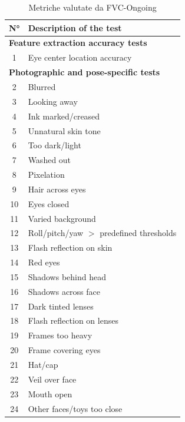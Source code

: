 \documentclass[12pt,a4paper,openright,twoside]{book}
\begin{document}
\begin{table}[h!]
\centering
\begin{tabular}{|c|p{10cm}|}
\hline
\textbf{N°} & \textbf{Description of the test} \\
\hline
\multicolumn{2}{|l|}{\textbf{Feature extraction accuracy tests}} \\
\hline
1 & Eye center location accuracy \\
\hline
\multicolumn{2}{|l|}{\textbf{Photographic and pose-specific tests}} \\
\hline
2 & Blurred \\
3 & Looking away \\
4 & Ink marked/creased \\
5 & Unnatural skin tone \\
6 & Too dark/light \\
7 & Washed out \\
8 & Pixelation \\
9 & Hair across eyes \\
10 & Eyes closed \\
11 & Varied background \\
12 & Roll/pitch/yaw $>$ predefined thresholds \\
13 & Flash reflection on skin \\
14 & Red eyes \\
15 & Shadows behind head \\
16 & Shadows across face \\
17 & Dark tinted lenses \\
18 & Flash reflection on lenses \\
19 & Frames too heavy \\
20 & Frame covering eyes \\
21 & Hat/cap \\
22 & Veil over face \\
23 & Mouth open \\
24 & Other faces/toys too close \\
\hline
\end{tabular}
\caption{Metriche valutate da FVC-Ongoing}
\label{tab:fvc-table}
\end{table}
\end{document}
